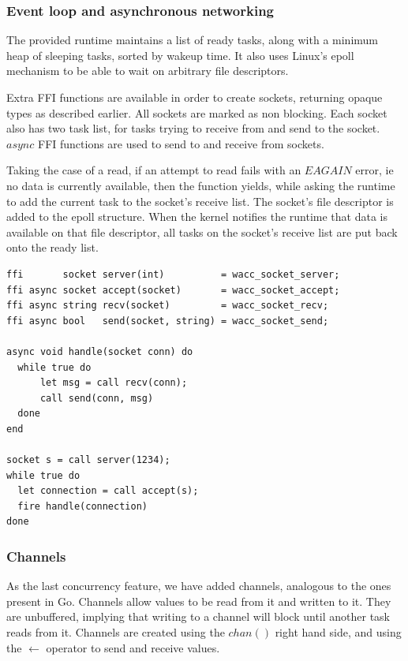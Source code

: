 \documentclass{article}
\begin{document}
\subsubsection{Event loop and asynchronous networking}
The provided runtime maintains a list of ready tasks, along with a minimum heap of sleeping tasks, sorted by wakeup time.
It also uses Linux's epoll mechanism to be able to wait on arbitrary file descriptors.

Extra FFI functions are available in order to create sockets, returning opaque types as described earlier. All sockets
are marked as non blocking. Each socket also has two task list, for tasks trying to receive from and send to the socket.
$async$ FFI functions are used to send to and receive from sockets.

Taking the case of a read, if an attempt to read fails with an $EAGAIN$ error, ie no data is currently available, then
the function yields, while asking the runtime to add the current task to the socket's receive list. The socket's file
descriptor is added to the epoll structure. When the kernel notifies the runtime that data is available on that file
descriptor, all tasks on the socket's receive list are put back onto the ready list.

\begin{lstlisting}
ffi       socket server(int)          = wacc_socket_server;
ffi async socket accept(socket)       = wacc_socket_accept;
ffi async string recv(socket)         = wacc_socket_recv;
ffi async bool   send(socket, string) = wacc_socket_send;

async void handle(socket conn) do
  while true do
      let msg = call recv(conn);
      call send(conn, msg)
  done
end

socket s = call server(1234);
while true do
  let connection = call accept(s);
  fire handle(connection)
done
\end{lstlisting}

\subsubsection{Channels}
As the last concurrency feature, we have added channels, analogous to the ones present in Go.
Channels allow values to be read from it and written to it. They are unbuffered, implying that writing to a channel will block
until another task reads from it. Channels are created using the $chan()$ right hand side, and using the $\leftarrow$ operator
to send and receive values.
\end{document}
